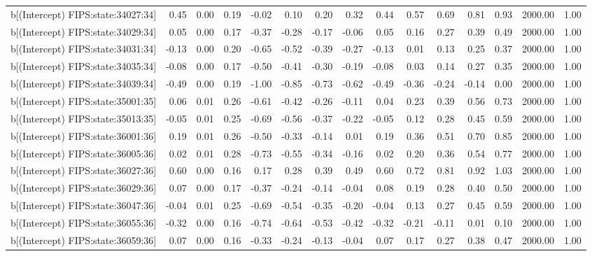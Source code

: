 \begin{table}[ht]
\begin{tabular}{rrrrrrrrrrrrrrr}
  b[(Intercept) FIPS:state:34027:34] & 0.45 & 0.00 & 0.19 & -0.02 & 0.10 & 0.20 & 0.32 & 0.44 & 0.57 & 0.69 & 0.81 & 0.93 & 2000.00 & 1.00 \\ 
  b[(Intercept) FIPS:state:34029:34] & 0.05 & 0.00 & 0.17 & -0.37 & -0.28 & -0.17 & -0.06 & 0.05 & 0.16 & 0.27 & 0.39 & 0.49 & 2000.00 & 1.00 \\ 
  b[(Intercept) FIPS:state:34031:34] & -0.13 & 0.00 & 0.20 & -0.65 & -0.52 & -0.39 & -0.27 & -0.13 & 0.01 & 0.13 & 0.25 & 0.37 & 2000.00 & 1.00 \\ 
  b[(Intercept) FIPS:state:34035:34] & -0.08 & 0.00 & 0.17 & -0.50 & -0.41 & -0.30 & -0.19 & -0.08 & 0.03 & 0.14 & 0.27 & 0.35 & 2000.00 & 1.00 \\ 
  b[(Intercept) FIPS:state:34039:34] & -0.49 & 0.00 & 0.19 & -1.00 & -0.85 & -0.73 & -0.62 & -0.49 & -0.36 & -0.24 & -0.14 & 0.00 & 2000.00 & 1.00 \\ 
  b[(Intercept) FIPS:state:35001:35] & 0.06 & 0.01 & 0.26 & -0.61 & -0.42 & -0.26 & -0.11 & 0.04 & 0.23 & 0.39 & 0.56 & 0.73 & 2000.00 & 1.00 \\ 
  b[(Intercept) FIPS:state:35013:35] & -0.05 & 0.01 & 0.25 & -0.69 & -0.56 & -0.37 & -0.22 & -0.05 & 0.12 & 0.28 & 0.45 & 0.59 & 2000.00 & 1.00 \\ 
  b[(Intercept) FIPS:state:36001:36] & 0.19 & 0.01 & 0.26 & -0.50 & -0.33 & -0.14 & 0.01 & 0.19 & 0.36 & 0.51 & 0.70 & 0.85 & 2000.00 & 1.00 \\ 
  b[(Intercept) FIPS:state:36005:36] & 0.02 & 0.01 & 0.28 & -0.73 & -0.55 & -0.34 & -0.16 & 0.02 & 0.20 & 0.36 & 0.54 & 0.77 & 2000.00 & 1.00 \\ 
  b[(Intercept) FIPS:state:36027:36] & 0.60 & 0.00 & 0.16 & 0.17 & 0.28 & 0.39 & 0.49 & 0.60 & 0.72 & 0.81 & 0.92 & 1.03 & 2000.00 & 1.00 \\ 
  b[(Intercept) FIPS:state:36029:36] & 0.07 & 0.00 & 0.17 & -0.37 & -0.24 & -0.14 & -0.04 & 0.08 & 0.19 & 0.28 & 0.40 & 0.50 & 2000.00 & 1.00 \\ 
  b[(Intercept) FIPS:state:36047:36] & -0.04 & 0.01 & 0.25 & -0.69 & -0.54 & -0.35 & -0.20 & -0.04 & 0.13 & 0.27 & 0.45 & 0.59 & 2000.00 & 1.00 \\ 
  b[(Intercept) FIPS:state:36055:36] & -0.32 & 0.00 & 0.16 & -0.74 & -0.64 & -0.53 & -0.42 & -0.32 & -0.21 & -0.11 & 0.01 & 0.10 & 2000.00 & 1.00 \\ 
  b[(Intercept) FIPS:state:36059:36] & 0.07 & 0.00 & 0.16 & -0.33 & -0.24 & -0.13 & -0.04 & 0.07 & 0.17 & 0.27 & 0.38 & 0.47 & 2000.00 & 1.00 \\ 

\end{tabular}
\end{table}
